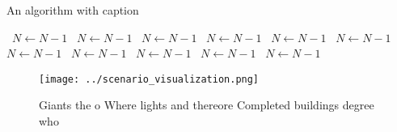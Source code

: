 \documentclass[a4paper]{article}
\begin{document}
\begin{algorithm}
\caption{An algorithm with caption}
\begin{algorithmic}
\    \State $N \gets N - 1$
\    \State $N \gets N - 1$
\    \State $N \gets N - 1$
\    \State $N \gets N - 1$
\    \State $N \gets N - 1$
\    \State $N \gets N - 1$
\    \State $N \gets N - 1$
\    \State $N \gets N - 1$
\    \State $N \gets N - 1$
\    \State $N \gets N - 1$
\    \State $N \gets N - 1$
\EndWhile
\end{algorithmic}
\end{algorithm}

\begin{figure}
\centering
\texttt{[image: ../scenario\_visualization.png]}
\caption{Giants the o Where lights and thereore Completed buildings degree who
}
\end{figure}
 
\end{document}
